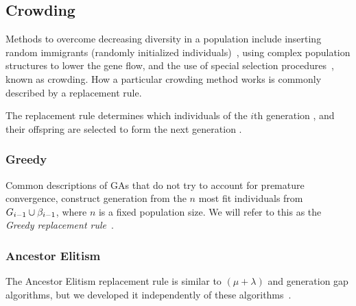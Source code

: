 \subsection{Crowding}\label{sec:replacementrules}
Methods to overcome decreasing diversity in a population include inserting random immigrants (randomly initialized individuals)~\cite{Cobb93geneticalgorithms}, using complex population structures to lower the gene flow, and the use of special selection procedures~\cite{ursem2002diversity, DeJong:1975:ABC:907087}, known as crowding. How a particular crowding method works is commonly described by a replacement rule.

The replacement rule determines which individuals of the $i$th generation , and their offspring  are selected to form the next generation .

\subsubsection{Greedy}
Common descriptions of GAs that do not try to account for premature convergence,
construct generation  from the $n$ most fit individuals from $G_{i-1} \cup \beta_{i-1}$, where $n$ is a fixed population size. We will refer to this as the \emph{Greedy replacement rule}~\cite{masterThesisGANN}.


%

\subsubsection{Ancestor Elitism}
The Ancestor Elitism replacement rule is similar to $\left(\mu + \lambda\right)$ and generation gap algorithms, but we developed it independently of these algorithms~\cite[p.\ 34, p.\ 50]{Luke2013Metaheuristics}.

